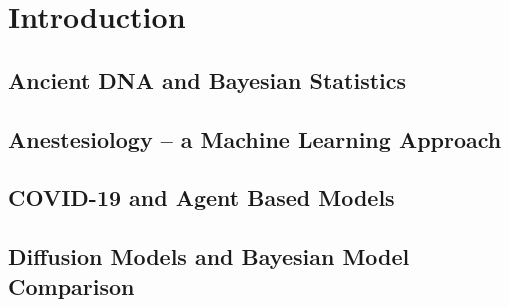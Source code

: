 
\chapter{Introduction}



\section{Ancient DNA and Bayesian Statistics}
\label{section:ancientDNA}



\section{Anestesiology -- a Machine Learning Approach }
\label{section:machine-learning}


\section{COVID-19 and Agent Based Models}
\label{section:agent-based-models}


\section{Diffusion Models and Bayesian Model Comparison}
\label{section:diffusion}



